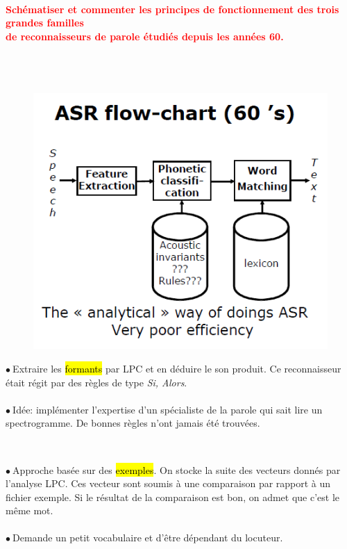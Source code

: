 \documentclass[letterpaper, 12pt]{article}
\newcommand{\red}[1]{
	\textcolor{red}{#1}
}
\newcommand{\point}{$\bullet\ $}
\begin{document}
		\paragraph{\red{Schématiser et commenter les principes de fonctionnement des trois grandes familles 
		~\\ \hspace*{0.035cm} de reconnaisseurs de parole étudiés depuis les années 60.}}~\\~\\
			\begin{minipage}{0.4\textwidth}
				\begin{figure}[H]
					\centering
					\includegraphics[scale=0.45]{Images/60s}
				\end{figure}\noindent
			\end{minipage}\hfill
			\begin{minipage}{0.55\textwidth}
				\point Extraire les \hl{formants} par LPC et en déduire le son produit. 
					Ce reconnaisseur était régit par des règles de type \textit{Si, Alors}. \\~\\
				\point Idée: implémenter l'expertise d'un spécialiste de la
					parole qui sait lire un spectrogramme. De bonnes règles n'ont jamais été trouvées.
			\end{minipage}~\\
			\begin{minipage}{0.55\textwidth}
				\point Approche basée sur des \hl{exemples}. On stocke la suite des vecteurs donnés par l'analyse
					LPC. Ces vecteur sont soumis à une comparaison par rapport à un fichier exemple.
					Si le résultat de la comparaison est bon, on admet que c'est le même mot.\\~\\
				\point Demande un petit vocabulaire et d'être dépendant du locuteur.
			\end{minipage}\hfill
\end{document}
